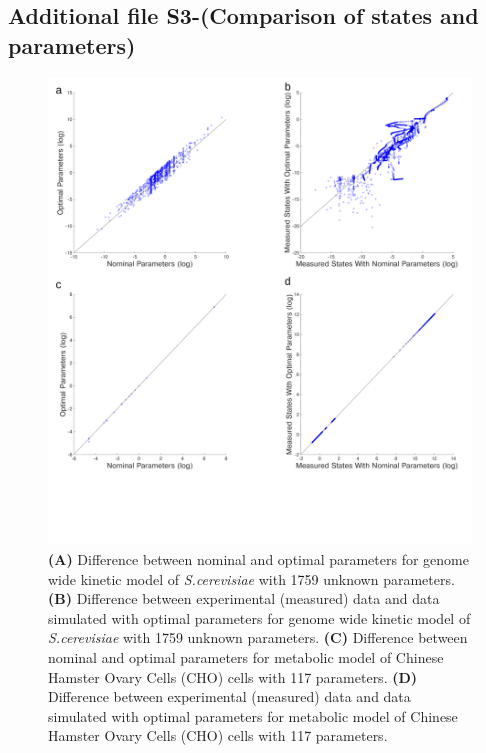 \documentclass{bmcart}
\begin{document}
\begin{backmatter}
\subsection*{Additional file S3-(Comparison of states and parameters)}
\begin{figure}[ht]
\centering
\includegraphics[width=1.00\textwidth]{./rachelfigs/fig_s3-crop.pdf}
\caption{ \textbf {(A)} Difference between nominal and optimal parameters for genome wide kinetic model of \textit{S.cerevisiae} with 1759 unknown parameters. \textbf {(B)} Difference between experimental (measured) data and data simulated with optimal parameters for genome wide kinetic model of \textit{S.cerevisiae} with 1759 unknown parameters. \textbf {(C)} Difference between nominal and optimal parameters for metabolic model of Chinese  Hamster Ovary Cells (CHO) cells with 117 parameters. \textbf {(D)} Difference between experimental (measured) data and data simulated with optimal parameters for metabolic model of Chinese  Hamster Ovary Cells (CHO) cells with 117 parameters.
}\label{fig-benchmark}
\end{figure}


\end{backmatter}
\end{document}
